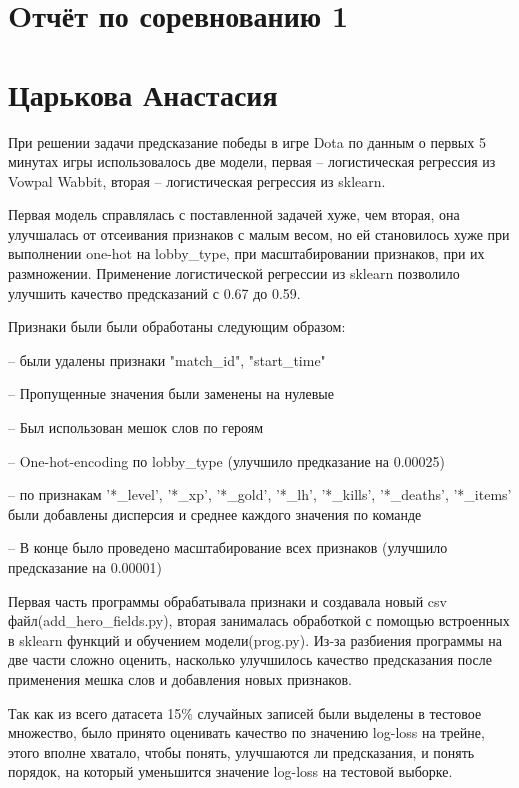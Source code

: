 \documentclass[10pt,reqno]{amsart}
\theoremstyle{definition}
\theoremstyle{remark}
\begin{document}
\section*{Oтчёт по соревнованию 1}
\section*{Царькова Анастасия}

При решении задачи предсказание победы в игре Dota по данным о первых 5 минутах игры использовалось две модели, первая -- логистическая регрессия из Vowpal Wabbit, вторая -- логистическая регрессия из sklearn.
\newline

Первая модель справлялась с поставленной задачей хуже, чем вторая, она улучшалась от отсеивания признаков с малым весом, но ей становилось хуже при выполнении one-hot на lobby\_type, при масштабировании признаков, при их размножении. Применение логистической регрессии из sklearn позволило улучшить качество предсказаний с 0.67 до 0.59.
\newline


Признаки были были обработаны следующим образом:
\newline

-- были удалены признаки "match\_id", "start\_time"
\newline

-- Пропущенные значения были заменены на нулевые
\newline

-- Был использован мешок слов по героям
\newline


-- One-hot-encoding по lobby\_type (улучшило предказание на 0.00025)
\newline


-- по признакам '*\_level', '*\_xp', '*\_gold', '*\_lh', '*\_kills', '*\_deaths', '*\_items' были добавлены дисперсия и среднее каждого значения по команде
\newline


-- В конце было проведено масштабирование всех признаков (улучшило предсказание на 0.00001)
\newline


Первая часть программы обрабатывала признаки и создавала новый csv файл(add\_hero\_fields.py), вторая занималась обработкой с помощью встроенных в sklearn функций и обучением модели(prog.py). Из-за разбиения программы на две части сложно оценить, насколько улучшилось качество предсказания после применения мешка слов и добавления новых признаков.
\newline


Так как из всего датасета 15\% случайных записей были выделены в тестовое множество, было принято оценивать качество по значению log-loss на трейне, этого вполне хватало, чтобы понять, улучшаются ли предсказания, и понять порядок, на который уменьшится значение log-loss на тестовой выборке.
\end{document}
